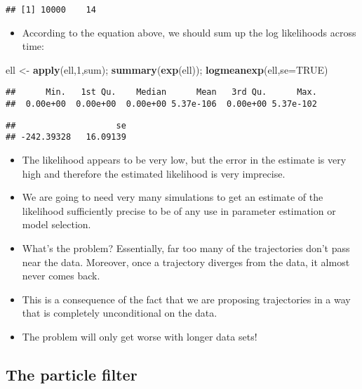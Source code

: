 \documentclass[]{article}
\newenvironment{Shaded}{\begin{snugshade}}{\end{snugshade}}
\newcommand{\KeywordTok}[1]{\textcolor[rgb]{0.13,0.29,0.53}{\textbf{#1}}}
\newcommand{\DataTypeTok}[1]{\textcolor[rgb]{0.13,0.29,0.53}{#1}}
\newcommand{\DecValTok}[1]{\textcolor[rgb]{0.00,0.00,0.81}{#1}}
\newcommand{\StringTok}[1]{\textcolor[rgb]{0.31,0.60,0.02}{#1}}
\newcommand{\OtherTok}[1]{\textcolor[rgb]{0.56,0.35,0.01}{#1}}
\newcommand{\NormalTok}[1]{#1}
\providecommand{\tightlist}{%
  \setlength{\itemsep}{0pt}\setlength{\parskip}{0pt}}
\begin{document}
\begin{verbatim}
## [1] 10000    14
\end{verbatim}

\begin{itemize}
\tightlist
\item
  According to the equation above, we should sum up the log likelihoods
  across time:
\end{itemize}

\begin{Shaded}
\begin{Highlighting}[]
\NormalTok{ell <-}\StringTok{ }\KeywordTok{apply}\NormalTok{(ell,}\DecValTok{1}\NormalTok{,sum); }\KeywordTok{summary}\NormalTok{(}\KeywordTok{exp}\NormalTok{(ell)); }\KeywordTok{logmeanexp}\NormalTok{(ell,}\DataTypeTok{se=}\OtherTok{TRUE}\NormalTok{)}
\end{Highlighting}
\end{Shaded}

\begin{verbatim}
##      Min.   1st Qu.    Median      Mean   3rd Qu.      Max. 
##  0.00e+00  0.00e+00  0.00e+00 5.37e-106  0.00e+00 5.37e-102
\end{verbatim}

\begin{verbatim}
##                    se 
## -242.39328   16.09139
\end{verbatim}

\begin{itemize}
\item
  The likelihood appears to be very low, but the error in the estimate
  is very high and therefore the estimated likelihood is very imprecise.
\item
  We are going to need very many simulations to get an estimate of the
  likelihood sufficiently precise to be of any use in parameter
  estimation or model selection.
\item
  What's the problem? Essentially, far too many of the trajectories
  don't pass near the data. Moreover, once a trajectory diverges from
  the data, it almost never comes back.
\item
  This is a consequence of the fact that we are proposing trajectories
  in a way that is completely unconditional on the data.
\item
  The problem will only get worse with longer data sets!
\end{itemize}

\hypertarget{the-particle-filter}{\subsection{The particle
filter}\label{the-particle-filter}}
\end{document}
